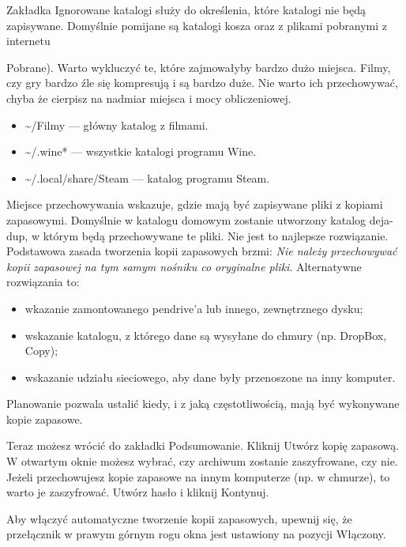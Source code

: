 Zakładka \textcolor{ubuntu_orange}{Ignorowane katalogi} służy do określenia, które katalogi nie będą zapisywane. Domyślnie pomijane są katalogi kosza oraz z plikami pobranymi z internetu {Pobrane). Warto wykluczyć te, które zajmowałyby bardzo dużo miejsca. Filmy, czy gry bardzo źle się kompresują i są bardzo duże. Nie warto ich przechowywać, chyba że cierpisz na nadmiar miejsca i mocy obliczeniowej.
\begin{itemize}
\item \textcolor{ubuntu_orange}{\textasciitilde /Filmy} --- główny katalog z filmami.
\item \textcolor{ubuntu_orange}{\textasciitilde /.wine*} --- wszystkie katalogi programu Wine.
\item \textcolor{ubuntu_orange}{\textasciitilde /.local/share/Steam} --- katalog programu Steam.
\end{itemize}

\textcolor{ubuntu_orange}{Miejsce przechowywania} wskazuje, gdzie mają być zapisywane pliki z kopiami zapasowymi.  Domyślnie w katalogu domowym zostanie utworzony katalog \textcolor{ubuntu_orange}{deja-dup}, w którym będą przechowywane te pliki. Nie jest to najlepsze rozwiązanie. Podstawowa zasada tworzenia kopii zapasowych brzmi: \emph{Nie należy przechowywać kopii zapasowej na tym samym nośniku co oryginalne pliki}. Alternatywne rozwiązania to:
\begin{itemize}
\item wkazanie zamontowanego pendrive'a lub innego, zewnętrznego dysku;
\item wskazanie katalogu, z którego dane są wysyłane do chmury (np. DropBox, Copy);
\item wskazanie udziału sieciowego, aby dane były przenoszone na inny komputer.
\end{itemize}

\textcolor{ubuntu_orange}{Planowanie} pozwala ustalić kiedy, i z jaką częstotliwością, mają być wykonywane kopie zapasowe.

Teraz możesz wrócić do zakładki \textcolor{ubuntu_orange}{Podsumowanie}. Kliknij \textcolor{ubuntu_orange}{Utwórz kopię zapasową}. W otwartym oknie możesz wybrać, czy archiwum zostanie zaszyfrowane, czy nie. Jeżeli przechowujesz kopie zapasowe na innym komputerze (np. w chmurze), to warto je zaszyfrować. Utwórz hasło i kliknij \textcolor{ubuntu_orange}{Kontynuj}.

Aby włączyć automatyczne tworzenie kopii zapasowych, upewnij się, że przełącznik w prawym górnym rogu okna jest ustawiony na pozycji \textcolor{ubuntu_orange}{Włączony}.

}
